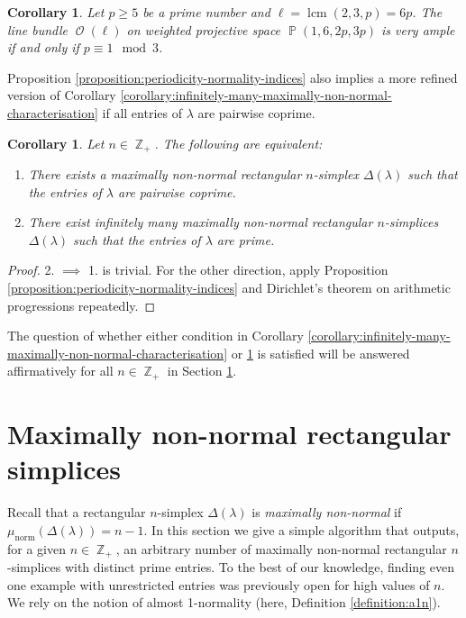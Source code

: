 \documentclass[a4paper,11pt]{amsart}
\theoremstyle{plain}
\newtheorem{corollary}[theorem]{Corollary}
\theoremstyle{definition}
\theoremstyle{remark}
\DeclareMathOperator{\ZZ}{\mathbb{Z}}
\DeclareMathOperator{\PP}{\mathbb{P}}
\DeclareMathOperator{\cO}{\mathcal{O}}
\DeclareMathOperator{\lcm}{lcm}
\DeclareMathOperator{\norm}{norm}
\begin{document}
\begin{corollary}\label{corollary:2-3-p}
    Let $p\geq 5$ be a prime number and $\ell = \lcm(2,3,p) = 6p$.
    The line bundle $\cO(\ell)$ on weighted projective space $\PP(1,6,2p,3p)$ is very ample if and only if $p \equiv 1 \mod 3$.
\end{corollary}

Proposition \ref{proposition:periodicity-normality-indices} also implies a more refined version of Corollary \ref{corollary:infinitely-many-maximally-non-normal-characterisation} if all entries of $\lambda$ are pairwise coprime.

\begin{corollary}\label{corollary:infinitely-many-maximally-non-normal-characterisation-coprime}
    Let $n \in \ZZ_+$. The following are equivalent:
    \begin{enumerate}[1.]
        \item There exists a maximally non-normal rectangular $n$-simplex $\Delta(\lambda)$ such that the entries of $\lambda$ are pairwise coprime.
        \item There exist infinitely many maximally non-normal rectangular $n$-simplices $\Delta(\lambda)$ such that the entries of $\lambda$ are prime.
    \end{enumerate}
\end{corollary}

\begin{proof}
    2. $\implies$ 1. is trivial. For the other direction, apply Proposition \ref{proposition:periodicity-normality-indices} and Dirichlet's theorem on arithmetic progressions repeatedly.
\end{proof}

The question of whether either condition in Corollary \ref{corollary:infinitely-many-maximally-non-normal-characterisation} or \ref{corollary:infinitely-many-maximally-non-normal-characterisation-coprime} is satisfied will be answered affirmatively for all $n \in \ZZ_+$ in Section \ref{section:maximally-non-normal}.

\section{Maximally non-normal rectangular simplices}\label{section:maximally-non-normal}

Recall that a rectangular $n$-simplex $\Delta(\lambda)$ is \emph{maximally non-normal} if $\mu_{\norm}(\Delta(\lambda)) = n - 1$. In this section we give a simple algorithm that outputs, for a given $n \in \ZZ_+$, an arbitrary number of maximally non-normal rectangular $n$-simplices with distinct prime entries. To the best of our knowledge, finding even one example with unrestricted entries was previously open for high values of $n$. We rely on the notion of almost 1-normality \cite{BrunsGubeladze:1999} (here, Definition \ref{definition:a1n}).
\end{document}
